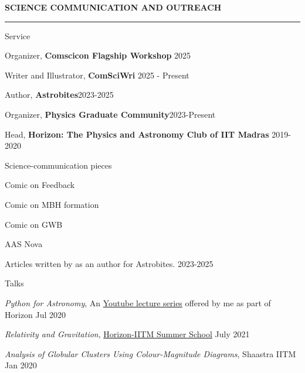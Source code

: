 \documentclass{resume} %
\renewenvironment{rSection}[1]{
\sectionskip
\textbf{\textcolor{C2}{\MakeUppercase{#1}}}
\sectionlineskip
\hrule
\begin{list}{}{
\setlength{\leftmargin}{1.5em}
}
\item[]
}{
\end{list}
}
\begin{document}
\begin{rSection}{Science communication and outreach}
    \begin{rSubsection}{Service}{}{}{}
    \item Organizer, {\color{C3} \textbf{Comscicon Flagship Workshop}} \hfill 2025
    \item Writer and Illustrator, {\color{C3} \textbf{ComSciWri}} \hfill 2025 - Present
    \item Author, {\color{C3} \textbf{Astrobites}}\hfill 2023-2025
    \item Organizer, {\color{C3} \textbf{Physics Graduate Community}}\hfill 2023-Present
    \item Head, {\color{C3} \textbf{Horizon: The Physics and Astronomy Club of IIT Madras}} \hfill 2019-2020
    \end{rSubsection}

    \begin{rSubsection}{Science-communication pieces}{}{}{}
    \item Comic on Feedback 
    \item Comic on MBH formation
    \item Comic on GWB
    \item AAS Nova
    \item Articles written by as an author for Astrobites. \hfill 2023-2025
    \end{rSubsection}

    \begin{rSubsection}{Talks}{}{}{}
     \item \textit{\color{C2} Python for Astronomy}, An \href{https://youtu.be/HfYR0uwYAyM}{Youtube lecture series} offered by me as part of Horizon \hfill Jul 2020
    \item \textit{\color{C2} Relativity and Gravitation}, \href{https://github.com/HorizonIITM/summer-school-2021}{Horizon-IITM Summer School} \hfill July 2021
    \item \textit{\color{C2} Analysis of Globular Clusters Using
    Colour-Magnitude Diagrams}, Shaastra IITM \hfill Jan 2020
    \end{rSubsection}
\end{rSection}
\end{document}
